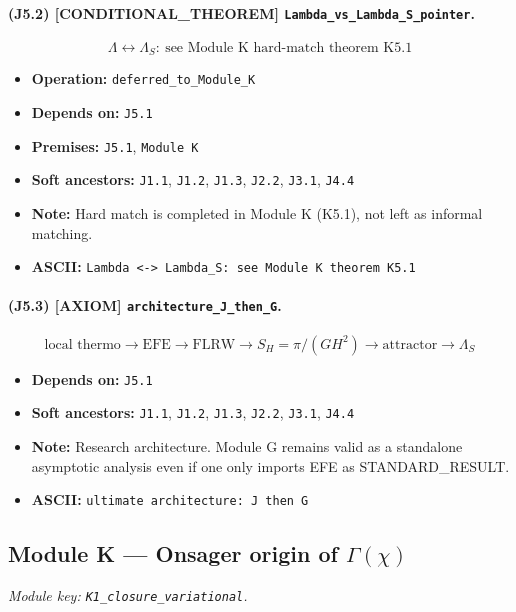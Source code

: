 \documentclass[11pt,a4paper]{article}
\theoremstyle{remark}\newtheorem*{caution}{Caution}
\newcommand{\tagbox}[1]{\textsc{[#1]}}
\begin{document}
\paragraph{(J5.2) \tagbox{CONDITIONAL\_THEOREM} \texttt{Lambda\_vs\_Lambda\_S\_pointer}.}
\begin{equation}
\Lambda\leftrightarrow\Lambda_S:\ \text{see Module K hard-match theorem K5.1}
\tag{J5.2}
\end{equation}
\begin{itemize}\setlength{\itemsep}{0.12em}
\item \textbf{Operation:} \texttt{deferred\_to\_Module\_K}
\item \textbf{Depends on:} \texttt{J5.1}
\item \textbf{Premises:} \texttt{J5.1}, \texttt{Module K}
\item \textbf{Soft ancestors:} \texttt{J1.1}, \texttt{J1.2}, \texttt{J1.3}, \texttt{J2.2}, \texttt{J3.1}, \texttt{J4.4}
\item \textbf{Note:} Hard match is completed in Module K (K5.1), not left as informal matching.
\item \textbf{ASCII:} \texttt{Lambda <-> Lambda\_S: see Module K theorem K5.1}
\end{itemize}
\paragraph{(J5.3) \tagbox{AXIOM} \texttt{architecture\_J\_then\_G}.}
\begin{equation}
\text{local thermo}\to\text{EFE}\to\text{FLRW}\to S_H=\pi/(GH^2)\to\text{attractor}\to\Lambda_S
\tag{J5.3}
\end{equation}
\begin{itemize}\setlength{\itemsep}{0.12em}
\item \textbf{Depends on:} \texttt{J5.1}
\item \textbf{Soft ancestors:} \texttt{J1.1}, \texttt{J1.2}, \texttt{J1.3}, \texttt{J2.2}, \texttt{J3.1}, \texttt{J4.4}
\item \textbf{Note:} Research architecture. Module G remains valid as a standalone asymptotic analysis even if one only imports EFE as STANDARD\_RESULT.
\item \textbf{ASCII:} \texttt{ultimate architecture: J then G}
\end{itemize}
\subsection{Module K --- Onsager origin of $\Gamma(\chi)$}
\textit{Module key: \texttt{K1\_closure\_variational}.}
\end{document}
